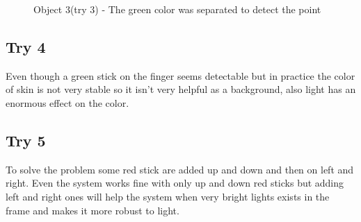 \begin{figure}
	 \caption{Object 3(try 3) - The green color was separated to detect the point}
\end{figure}


\subsection{Try 4}
Even though a green stick on the finger seems detectable but in practice the color of skin is not very stable so it isn't very helpful as a background, also light has an enormous effect on the color.
\subsection{Try 5}
To solve the problem some red stick are added up and down and then on left and right. Even the system works fine with only  up and down red sticks but adding left and right ones will help the system when very bright lights exists in the frame and makes it more robust to light.

